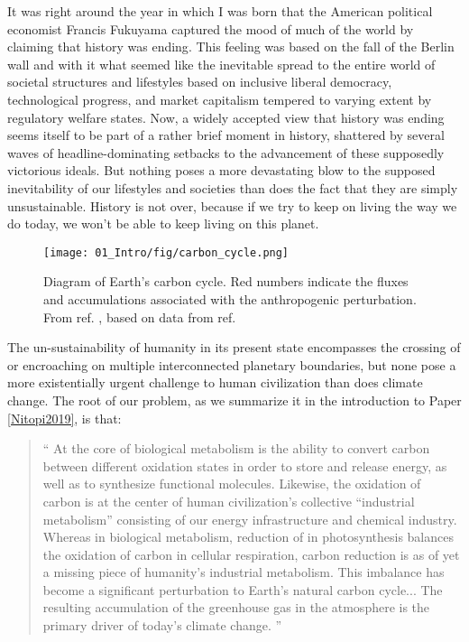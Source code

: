 It was right around the year in which I was born that the American political economist Francis Fukuyama captured the mood of much of the world by claiming that history was ending\cite{Fukuyama1992}. This feeling was based on the fall of the Berlin wall and with it what seemed like the inevitable spread to the entire world of societal structures and lifestyles based on inclusive liberal democracy, technological progress, and market capitalism tempered to varying extent by regulatory welfare states. Now, a widely accepted view that history was ending seems itself to be part of a rather brief moment in history, shattered 
by several waves of headline-dominating setbacks to the advancement of these supposedly victorious ideals.
But nothing poses a more devastating blow to the supposed inevitability of our lifestyles and societies than does the fact that they are simply unsustainable. History is not over, because if we try to keep on living the way we do today, we won't be able to keep living on this planet.

\begin{figure}[h!]
	\centering
	\texttt{[image: 01\_Intro/fig/carbon\_cycle.png]}
	\caption{Diagram of Earth's carbon cycle. Red numbers indicate the fluxes and accumulations associated with the anthropogenic perturbation. From ref. , based on data from ref. }
	\label{fig:carbon_cycle}
\end{figure}

The un-sustainability of humanity in its present state encompasses the crossing of or encroaching on multiple interconnected planetary boundaries\cite{Rockstrom2009}, but none pose a more existentially urgent challenge to human civilization than does climate change. The root of our problem, as we summarize it in the introduction to Paper \ref{Nitopi2019}, is that:

\begin{quotation}
		{\Large``} At the core of biological metabolism is the ability to convert carbon between different oxidation states in order to store and release energy, as well as to synthesize functional molecules. Likewise, the oxidation of carbon is at the center of human civilization's collective “industrial metabolism” consisting of our energy infrastructure and chemical industry. Whereas in biological metabolism, reduction of  in photosynthesis balances the oxidation of carbon in cellular respiration, carbon reduction is as of yet a missing piece of humanity's industrial metabolism. This imbalance has become a significant perturbation to Earth's natural carbon cycle... The resulting accumulation of the greenhouse gas  in the atmosphere is the primary	driver of today’s climate change\cite{IPCC2014}. {\Large''}
\end{quotation}


